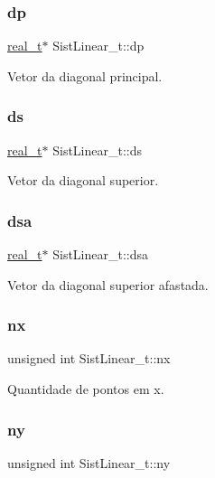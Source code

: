 \subsubsection{\texorpdfstring{dp}{dp}}
{\footnotesize\ttfamily \hyperlink{SistemasLineares_8h_a0d00e2b3dfadee81331bbb39068570c4}{real\+\_\+t}$\ast$ Sist\+Linear\+\_\+t\+::dp}

Vetor da diagonal principal. \mbox{\label{structSistLinear__t_add986d7f6004231eee2d838e7bc7596b}} 
\subsubsection{\texorpdfstring{ds}{ds}}
{\footnotesize\ttfamily \hyperlink{SistemasLineares_8h_a0d00e2b3dfadee81331bbb39068570c4}{real\+\_\+t}$\ast$ Sist\+Linear\+\_\+t\+::ds}

Vetor da diagonal superior. \mbox{\label{structSistLinear__t_a02d4791c1278b1a6a2796617e43fe29b}} 
\subsubsection{\texorpdfstring{dsa}{dsa}}
{\footnotesize\ttfamily \hyperlink{SistemasLineares_8h_a0d00e2b3dfadee81331bbb39068570c4}{real\+\_\+t}$\ast$ Sist\+Linear\+\_\+t\+::dsa}

Vetor da diagonal superior afastada. \mbox{\label{structSistLinear__t_a0f02ce66276316fd835180cf6a033001}} 
\subsubsection{\texorpdfstring{nx}{nx}}
{\footnotesize\ttfamily unsigned int Sist\+Linear\+\_\+t\+::nx}

Quantidade de pontos em x. \mbox{\label{structSistLinear__t_a84d8f1f84f050ca4dfc93a4ceaef2b9a}} 
\subsubsection{\texorpdfstring{ny}{ny}}
{\footnotesize\ttfamily unsigned int Sist\+Linear\+\_\+t\+::ny}

